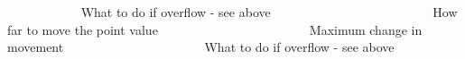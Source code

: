 ~\newline
~\newline
~\newline
~\newline
~\newline
~\newline
~\newline
 What to do if overflow -\/ see above ~\newline
~\newline
~\newline
~\newline
~\newline
~\newline
~\newline
~\newline
~\newline
~\newline
~\newline
~\newline
~\newline
~\newline
~\newline
 How far to move the point value ~\newline
~\newline
~\newline
~\newline
~\newline
~\newline
~\newline
~\newline
~\newline
~\newline
~\newline
~\newline
~\newline
~\newline
 Maximum change in movement ~\newline
~\newline
~\newline
~\newline
~\newline
~\newline
~\newline
~\newline
~\newline
~\newline
~\newline
~\newline
~\newline
 What to do if overflow -\/ see above ~\newline
